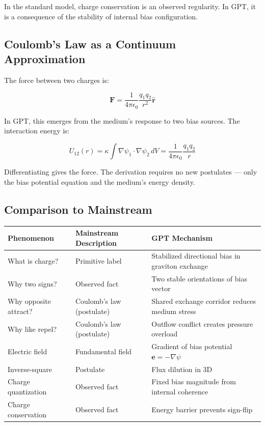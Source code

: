 \documentclass[12pt, a4paper]{article}
\begin{document}
In the standard model, charge conservation is an observed regularity. In GPT, it is a consequence of the stability of internal bias configuration.

\subsection{Coulomb's Law as a Continuum Approximation}
\label{subsec:coulomb_law}

The force between two charges is:

\[
\mathbf{F} = \frac{1}{4\pi\epsilon_0} \frac{q_1 q_2}{r^2} \hat{\mathbf{r}}
\]

In GPT, this emerges from the medium's response to two bias sources. The interaction energy is:

\[
U_{12}(r) = \kappa \int \nabla \psi_1 \cdot \nabla \psi_2 \, dV = \frac{1}{4\pi\epsilon_0} \frac{q_1 q_2}{r}
\]

Differentiating gives the force. The derivation requires no new postulates — only the bias potential equation and the medium's energy density.

\subsection{Comparison to Mainstream}
\label{subsec:charge_comparison}

\begin{center}
\begin{tabular}{|p{4cm}|p{5cm}|p{5cm}|}
\hline
\textbf{Phenomenon} & \textbf{Mainstream Description} & \textbf{GPT Mechanism} \\
\hline
What is charge? & Primitive label & Stabilized directional bias in graviton exchange \\
\hline
Why two signs? & Observed fact & Two stable orientations of bias vector \\
\hline
Why opposite attract? & Coulomb's law (postulate) & Shared exchange corridor reduces medium stress \\
\hline
Why like repel? & Coulomb's law (postulate) & Outflow conflict creates pressure overload \\
\hline
Electric field & Fundamental field & Gradient of bias potential \( \mathbf{e} = -\nabla \psi \) \\
\hline
Inverse-square & Postulate & Flux dilution in 3D \\
\hline
Charge quantization & Observed fact & Fixed bias magnitude from internal coherence \\
\hline
Charge conservation & Observed fact & Energy barrier prevents sign-flip \\
\hline
\end{tabular}
\end{center}
\end{document}
